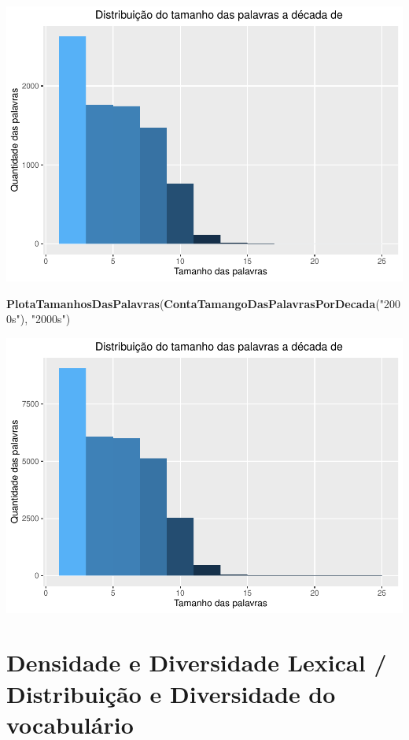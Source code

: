 \documentclass[]{article}
\newenvironment{Shaded}{\begin{snugshade}}{\end{snugshade}}
\newcommand{\KeywordTok}[1]{\textcolor[rgb]{0.13,0.29,0.53}{\textbf{#1}}}
\newcommand{\NormalTok}[1]{#1}
\newcommand{\StringTok}[1]{\textcolor[rgb]{0.31,0.60,0.02}{#1}}
\begin{document}
\includegraphics{avaliacaoLetrasDeForro_files/figure-latex/unnamed-chunk-8-5.pdf}

\begin{Shaded}
\begin{Highlighting}[]
\KeywordTok{PlotaTamanhosDasPalavras}\NormalTok{(}\KeywordTok{ContaTamangoDasPalavrasPorDecada}\NormalTok{(}\StringTok{"2000s"}\NormalTok{), }\StringTok{"2000s"}\NormalTok{)}
\end{Highlighting}
\end{Shaded}

\includegraphics{avaliacaoLetrasDeForro_files/figure-latex/unnamed-chunk-8-6.pdf}

\hypertarget{densidade-e-diversidade-lexical-distribuicao-e-diversidade-do-vocabulario}{%
\section{Densidade e Diversidade Lexical / Distribuição e Diversidade do
vocabulário}\label{densidade-e-diversidade-lexical-distribuicao-e-diversidade-do-vocabulario}}
\end{document}
